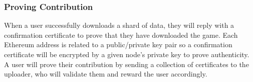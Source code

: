 
\subsubsection*{Proving Contribution}

When a user successfully downloads a shard of data, they will reply with a confirmation certificate to prove that they have downloaded the game. Each Ethereum address is related to a public/private key pair so a confirmation certificate will be encrypted by a given node's private key to prove authenticity. A user will prove their contribution  by sending a collection of certificates to the uploader, who will validate them and reward the user accordingly.